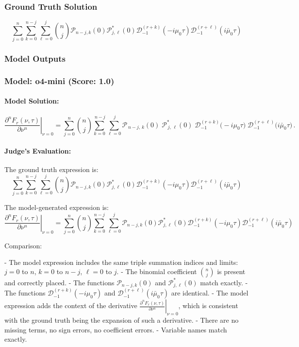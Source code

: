 \documentclass[10pt]{article}
\begin{document}
\subsubsection*{Ground Truth Solution}
\[ \boxed{\sum_{j=0}^{n}\sum_{k=0}^{n-j}\sum_{\ell=0}^{j}\binom{n}{j}\mathcal{P}_{n-j,k}\left(0\right)\mathcal{P}^{*}_{j,\ell}\left(0\right)\mathcal{D}^{\left(r+k\right)}_{-1}\left(-i\mu_{0}\tau\right)\mathcal{D}^{\left(r+\ell\right)}_{-1}\left(i\bar{\mu}_0\tau\right)} \]

\subsubsection*{Model Outputs}
\subsubsection*{Model: o4-mini (Score: 1.0)}
\paragraph*{Model Solution:}
\[ \left.\frac{\partial^nF_r(\nu,\tau)}{\partial\nu^n}\right|_{\nu=0}
=\sum_{j=0}^{n}\binom{n}{j}
\sum_{k=0}^{\,n-j}\sum_{\ell=0}^{\,j}
\mathcal P_{\,n-j,\,k}(0)\;\mathcal P^*_{\,j,\,\ell}(0)\;
\mathcal D^{(r+k)}_{-1}\bigl(-i\mu_0\tau\bigr)\;
\mathcal D^{(r+\ell)}_{-1}\bigl(i\bar\mu_0\tau\bigr)\,. \]

\paragraph*{Judge's Evaluation:}

The ground truth expression is:
\[
\sum_{j=0}^{n}\sum_{k=0}^{n-j}\sum_{\ell=0}^{j} \binom{n}{j} \mathcal{P}_{n-j,k}(0) \mathcal{P}^*_{j,\ell}(0) \mathcal{D}^{(r+k)}_{-1}(-i\mu_0 \tau) \mathcal{D}^{(r+\ell)}_{-1}(i\bar{\mu}_0 \tau)
\]

The model-generated expression is:
\[
\left.\frac{\partial^n F_r(\nu,\tau)}{\partial \nu^n}\right|_{\nu=0} = \sum_{j=0}^n \binom{n}{j} \sum_{k=0}^{n-j} \sum_{\ell=0}^j \mathcal{P}_{n-j,k}(0) \mathcal{P}^*_{j,\ell}(0) \mathcal{D}^{(r+k)}_{-1}(-i\mu_0 \tau) \mathcal{D}^{(r+\ell)}_{-1}(i\bar{\mu}_0 \tau)
\]

Comparison:

- The model expression includes the same triple summation indices and limits: $j=0$ to $n$, $k=0$ to $n-j$, $\ell=0$ to $j$.
- The binomial coefficient $\binom{n}{j}$ is present and correctly placed.
- The functions $\mathcal{P}_{n-j,k}(0)$ and $\mathcal{P}^*_{j,\ell}(0)$ match exactly.
- The functions $\mathcal{D}^{(r+k)}_{-1}(-i\mu_0 \tau)$ and $\mathcal{D}^{(r+\ell)}_{-1}(i\bar{\mu}_0 \tau)$ are identical.
- The model expression adds the context of the derivative $\left.\frac{\partial^n F_r(\nu,\tau)}{\partial \nu^n}\right|_{\nu=0}$, which is consistent with the ground truth being the expansion of such a derivative.
- There are no missing terms, no sign errors, no coefficient errors.
- Variable names match exactly.
\end{document}
